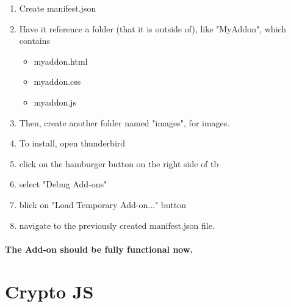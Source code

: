 \begin{enumerate}
\item Create manifest.json
\item Have it reference a folder (that it is outside of), like "MyAddon", which contains
\begin{itemize}
\item myaddon.html
\item myaddon.css
\item myaddon.js
\end{itemize}
\item Then, create another folder named "images", for images.
\item To install, open thunderbird
\item click on the hamburger button on the right side of tb
\item select "Debug Add-ons"
\item blick on "Load Temporary Add-on..." button
\item navigate to the previously created manifest.json file.
\end{enumerate}

\paragraph{The Add-on should be fully functional now.}


\section{Crypto JS}